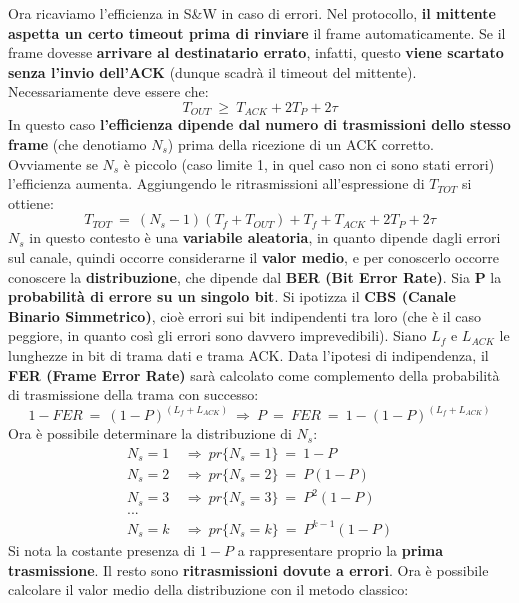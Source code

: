 \documentclass[12pt]{article}
\begin{document}
Ora ricaviamo l'efficienza in S\&W in caso di errori. Nel protocollo, \textbf{il mittente aspetta un certo timeout prima di rinviare} il frame automaticamente. Se il frame dovesse \textbf{arrivare al destinatario errato}, infatti, questo \textbf{viene scartato senza l'invio dell'ACK} (dunque scadrà il timeout del mittente). Necessariamente deve essere che:
\begin{equation*}
    T_{OUT}\ \geq\ T_{ACK} + 2T_P + 2\tau
\end{equation*}
In questo caso \textbf{l'efficienza dipende dal numero di trasmissioni dello stesso frame} (che denotiamo $N_s$) prima della ricezione di un ACK corretto. Ovviamente se $N_s$ è piccolo (caso limite 1, in quel caso non ci sono stati errori) l'efficienza aumenta. Aggiungendo le ritrasmissioni all'espressione di $T_{TOT}$ si ottiene:
\begin{equation*}
    T_{TOT}\ =\ (N_s - 1)(T_f + T_{OUT}) + T_f + T_{ACK} + 2T_P + 2\tau
\end{equation*}
$N_s$ in questo contesto è una \textbf{variabile aleatoria}, in quanto dipende dagli errori sul canale, quindi occorre considerarne il \textbf{valor medio}, e per conoscerlo occorre conoscere la \textbf{distribuzione}, che dipende dal \textbf{BER (Bit Error Rate)}. Sia \textbf{P} la \textbf{probabilità di errore su un singolo bit}. Si ipotizza il \textbf{CBS (Canale Binario Simmetrico)}, cioè errori sui bit indipendenti tra loro (che è il caso peggiore, in quanto così gli errori sono davvero imprevedibili). Siano $L_f$ e $L_{ACK}$ le lunghezze in bit di trama dati e trama ACK. Data l'ipotesi di indipendenza, il \textbf{FER (Frame Error Rate)} sarà calcolato come complemento della probabilità di trasmissione della trama con successo:
\begin{equation*}
    1 - FER\ =\ (1 - P)^{(L_f + L_{ACK})}\ \Rightarrow\ P\ =\ FER\ =\ 1 - (1 - P)^{(L_f + L_{ACK})}
\end{equation*}
Ora è possibile determinare la distribuzione di $N_s$:
\begin{align*}
    N_s = 1\ &\Rightarrow\ pr\{N_s = 1\}\ =\ 1 - P\\
    N_s = 2\ &\Rightarrow\ pr\{N_s = 2\}\ =\ P(1 - P)\\
    N_s = 3\ &\Rightarrow\ pr\{N_s = 3\}\ =\ P^2(1 - P)\\
    ...\\
    N_s = k\ &\Rightarrow\ pr\{N_s = k\}\ =\ P^{k-1}(1 - P)
\end{align*}
Si nota la costante presenza di $1-P$ a rappresentare proprio la \textbf{prima trasmissione}. Il resto sono \textbf{ritrasmissioni dovute a errori}. Ora è possibile calcolare il valor medio della distribuzione con il metodo classico:
\end{document}
